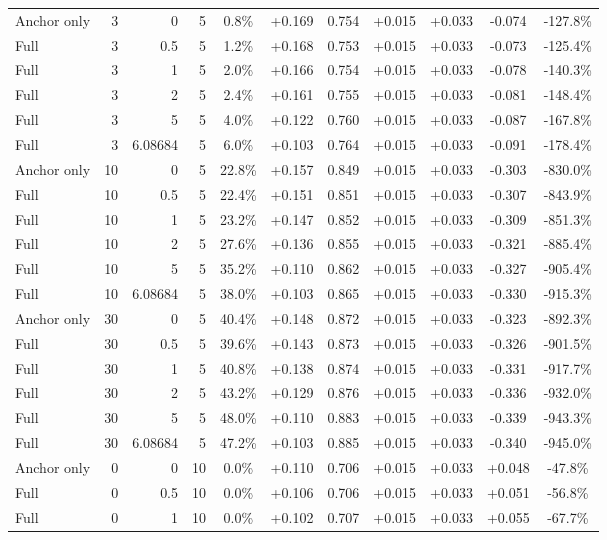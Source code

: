 \begin{table}[htbp]
\begin{tabular}{lrrrccccccc}
Anchor only & 3 & 0 & 5 & 0.8\% & +0.169 & 0.754 & +0.015 & +0.033 & -0.074 & -127.8\% \\
Full & 3 & 0.5 & 5 & 1.2\% & +0.168 & 0.753 & +0.015 & +0.033 & -0.073 & -125.4\% \\
Full & 3 & 1 & 5 & 2.0\% & +0.166 & 0.754 & +0.015 & +0.033 & -0.078 & -140.3\% \\
Full & 3 & 2 & 5 & 2.4\% & +0.161 & 0.755 & +0.015 & +0.033 & -0.081 & -148.4\% \\
Full & 3 & 5 & 5 & 4.0\% & +0.122 & 0.760 & +0.015 & +0.033 & -0.087 & -167.8\% \\
Full & 3 & 6.08684 & 5 & 6.0\% & +0.103 & 0.764 & +0.015 & +0.033 & -0.091 & -178.4\% \\
Anchor only & 10 & 0 & 5 & 22.8\% & +0.157 & 0.849 & +0.015 & +0.033 & -0.303 & -830.0\% \\
Full & 10 & 0.5 & 5 & 22.4\% & +0.151 & 0.851 & +0.015 & +0.033 & -0.307 & -843.9\% \\
Full & 10 & 1 & 5 & 23.2\% & +0.147 & 0.852 & +0.015 & +0.033 & -0.309 & -851.3\% \\
Full & 10 & 2 & 5 & 27.6\% & +0.136 & 0.855 & +0.015 & +0.033 & -0.321 & -885.4\% \\
Full & 10 & 5 & 5 & 35.2\% & +0.110 & 0.862 & +0.015 & +0.033 & -0.327 & -905.4\% \\
Full & 10 & 6.08684 & 5 & 38.0\% & +0.103 & 0.865 & +0.015 & +0.033 & -0.330 & -915.3\% \\
Anchor only & 30 & 0 & 5 & 40.4\% & +0.148 & 0.872 & +0.015 & +0.033 & -0.323 & -892.3\% \\
Full & 30 & 0.5 & 5 & 39.6\% & +0.143 & 0.873 & +0.015 & +0.033 & -0.326 & -901.5\% \\
Full & 30 & 1 & 5 & 40.8\% & +0.138 & 0.874 & +0.015 & +0.033 & -0.331 & -917.7\% \\
Full & 30 & 2 & 5 & 43.2\% & +0.129 & 0.876 & +0.015 & +0.033 & -0.336 & -932.0\% \\
Full & 30 & 5 & 5 & 48.0\% & +0.110 & 0.883 & +0.015 & +0.033 & -0.339 & -943.3\% \\
Full & 30 & 6.08684 & 5 & 47.2\% & +0.103 & 0.885 & +0.015 & +0.033 & -0.340 & -945.0\% \\
Anchor only & 0 & 0 & 10 & 0.0\% & +0.110 & 0.706 & +0.015 & +0.033 & +0.048 & -47.8\% \\
Full & 0 & 0.5 & 10 & 0.0\% & +0.106 & 0.706 & +0.015 & +0.033 & +0.051 & -56.8\% \\
Full & 0 & 1 & 10 & 0.0\% & +0.102 & 0.707 & +0.015 & +0.033 & +0.055 & -67.7\% \\

\end{tabular}
\end{table}
